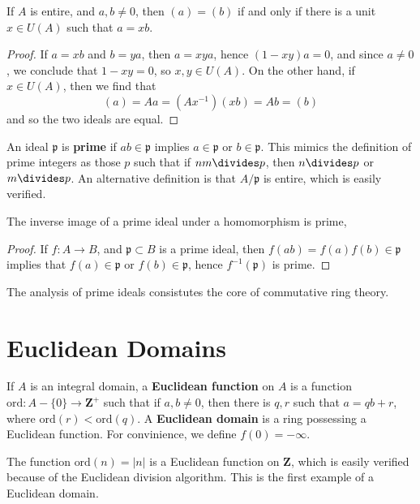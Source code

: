 \begin{theorem}
    If $A$ is entire, and $a,b \neq 0$, then $(a) = (b)$ if and only if there is a unit $x \in U(A)$ such that $a = xb$.
\end{theorem}
\begin{proof}
    If $a = xb$ and $b = ya$, then $a = xya$, hence $(1 - xy)a = 0$, and since $a \neq 0$, we conclude that $1 - xy = 0$, so $x,y \in U(A)$. On the other hand, if $x \in U(A)$, then we find that
    \[ (a) = Aa = (Ax^{-1})(xb) = Ab = (b) \]
    and so the two ideals are equal.
\end{proof}

An ideal $\mathfrak{p}$ is {\bf prime} if $ab \in \mathfrak{p}$ implies $a \in \mathfrak{p}$ or $b \in \mathfrak{p}$. This mimics the definition of prime integers as those $p$ such that if $nm \divides p$, then $n \divides p$ or $m \divides p$. An alternative definition is that $A/\mathfrak{p}$ is entire, which is easily verified.

\begin{theorem}
    The inverse image of a prime ideal under a homomorphism is prime, 
\end{theorem}
\begin{proof}
    If $f: A \to B$, and $\mathfrak{p} \subset B$ is a prime ideal, then $f(ab) = f(a)f(b) \in \mathfrak{p}$ implies that $f(a) \in \mathfrak{p}$ or $f(b) \in \mathfrak{p}$, hence $f^{-1}(\mathfrak{p})$ is prime.
\end{proof}

The analysis of prime ideals consistutes the core of commutative ring theory.

\section{Euclidean Domains}

If $A$ is an integral domain, a {\bf Euclidean function} on $A$ is a function $\text{ord}: A - \{ 0 \} \to \mathbf{Z}^+$ such that if $a,b \neq 0$, then there is $q,r$ such that $a = qb + r$, where $\text{ord}(r) < \text{ord}(q)$. A {\bf Euclidean domain} is a ring possessing a Euclidean function. For convinience, we define $f(0) = -\infty$.

\begin{example}
    The function $\text{ord}(n) = |n|$ is a Euclidean function on $\mathbf{Z}$, which is easily verified because of the Euclidean division algorithm. This is the first example of a Euclidean domain.
\end{example}

